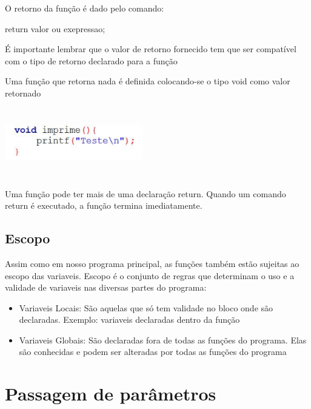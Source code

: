 \documentclass{report}
\begin{document}
	O retorno da função é dado pelo comando:
	
	\begin{center}
		\begin{LARGE}
			return valor ou exepressao;
		\end{LARGE}
	\end{center}
	
	É importante lembrar que o valor de retorno fornecido tem que ser compatível com o tipo de retorno declarado para a função

	Uma função que retorna nada é definida colocando-se o tipo void como valor retornado
	
	\begin{center}
		
		\includegraphics[width=6cm,height=3cm,keepaspectratio=false]{imagens/retorno.png}
		
	\end{center}
	
	Uma função pode ter mais de uma declaração return. Quando um comando return é executado, a função termina imediatamente.

	\subsection{Escopo}
	
	Assim como em nosso programa principal, as funções também estão sujeitas ao escopo das variaveis. Escopo é o conjunto de regras que determinam o uso e a validade de variaveis nas diversas partes do programa:
	
	\begin{itemize}
		\item Variaveis Locais: São aquelas que só tem validade no bloco onde são declaradas. Exemplo: variaveis declaradas dentro da função
		\item Variaveis Globais: São declaradas fora de todas as funções do programa. Elas são conhecidas e podem ser alteradas por todas as funções do programa	
	\end{itemize}
	
	
	\section{Passagem de parâmetros}
	
\end{document}
